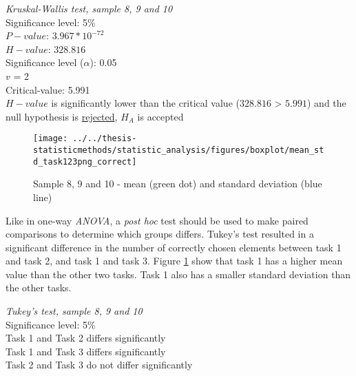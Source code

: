  \begin{center}
	\begin{tcolorbox}[box align=center,width=\textwidth-5cm]
		\centering
		\textit{Kruskal-Wallis test, sample 8, 9 and 10}\\
		Significance level: 5\%  \\[0.5cm]
		
		$P-value$: $3.967* 10^{-72}$ \\
		$H-value$: $328.816$ \\
		Significance level ($\alpha$): 0.05 \\
		$v$ = 2\\ %
		Critical-value:  5.991\\[0.2cm] %
		
		$H-value$ is significantly lower than the critical value ($328.816$ > $5.991$) and the null hypothesis is \underline{rejected}, $H_A$ is accepted\\[0.5cm]
	\end{tcolorbox} 
\end{center}

\begin{figure}[h!]
	\centering
	\texttt{[image: ../../thesis-statisticmethods/statistic\_analysis/figures/boxplot/mean\_std\_task123png\_correct]}
	\caption{Sample 8, 9 and 10 - mean (green dot) and standard deviation (blue line)}
	\label{fig:meanstdtask123pngcorrect}
\end{figure}

Like in one-way \textit{ANOVA}, a \textit{post hoc} test should be used to make paired comparisons to determine which groups differs. Tukey's test resulted in a significant difference in the number of correctly chosen elements between task 1 and task 2, and task 1 and task 3. Figure \ref{fig:meanstdtask123pngcorrect} show that task 1 has a higher mean value than the other two tasks. Task 1 also has a smaller standard deviation than the other tasks. 

 \begin{center}
	\begin{tcolorbox}[box align=center,width=\textwidth-5cm]
		\centering
		\textit{Tukey's test, sample 8, 9 and 10}\\
		Significance level: 5\%  \\[0.5cm]
		
		Task 1 and Task 2 differs significantly \\
		Task 1 and Task 3 differs significantly \\
		Task 2 and Task 3 do not differ significantly \\[0.2cm]
	\end{tcolorbox} 
\end{center}

